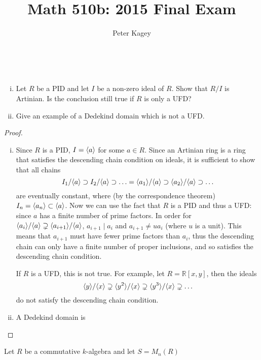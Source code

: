 \documentclass{article}
\begin{document}
\title{Math 510b: 2015 Final Exam}
\author{Peter Kagey}

\maketitle

\begin{problem}{1} ~
  \begin{enumerate}[(i)]
    \item Let $R$ be a PID and let $I$ be a non-zero ideal of $R$. Show that $R/I$ is Artinian.
    Is the conclusion still true if $R$ is only a UFD?
    \item Give an example of a Dedekind domain which is not a UFD.
  \end{enumerate}
\end{problem}

\begin{proof} ~
  \begin{enumerate}[(i)]
    \item Since $R$ is a PID, $I = \langle a \rangle$ for some $a \in R$.
    Since an Artinian ring is a ring that satisfies the descending chain
    condition on ideals, it is sufficient to show that all chains \[
      I_1/\langle a \rangle \supset I_2/\langle a \rangle \supset \hdots = \langle a_1 \rangle/\langle a \rangle \supset \langle a_2 \rangle/\langle a \rangle \supset \hdots
    \] are eventually constant, where (by the correspondence theorem)
    $I_n = \langle a_n \rangle \subset \langle a \rangle$.
    Now we can use the fact that $R$ is a PID and thus a UFD: since $a$ has
    a finite number of prime factors.
    In order for $\langle a_i \rangle/\langle a \rangle \supsetneq \langle a_{i+1} \rangle/\langle a \rangle$,
    $a_{i+1} \mid a_i$ and $a_{i+1} \neq ua_i$ (where $u$ is a unit).
    This means that $a_{i+1}$ must have fewer prime factors than $a_{i}$,
    thus the descending chain can only have a finite number of proper inclusions,
    and so satisfies the descending chain condition.

    If $R$ is a UFD, this is not true. For example, let $R = \mathbb R[x,y]$,
    then the ideals \[
      \langle y \rangle/\langle x \rangle \supsetneq \langle y^2 \rangle/\langle x \rangle \supsetneq \langle y^3 \rangle/\langle x \rangle \supsetneq \hdots
    \] do not satisfy the descending chain condition.

    \item A Dedekind domain is

  \end{enumerate}
\end{proof}
\pagebreak
\begin{problem}{2}
  Let $R$ be a commutative $k$-algebra and let $S = M_n(R)$
\end{problem}
\end{document}
